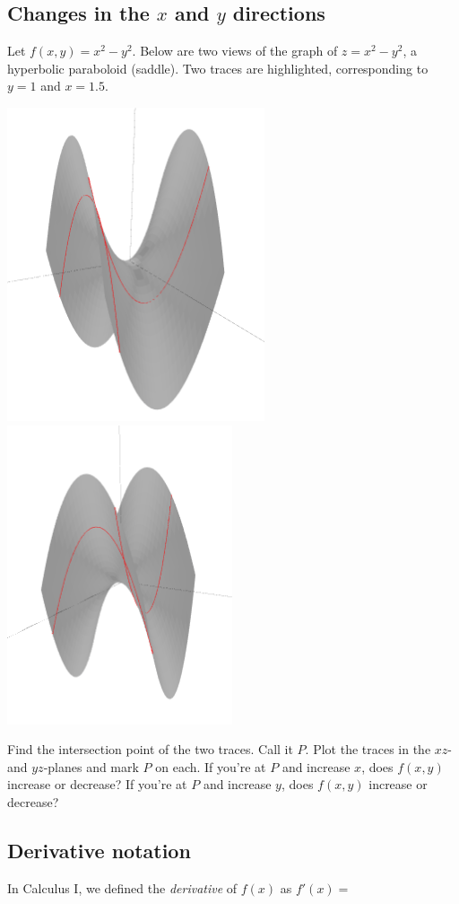 \subsection{Changes in the \texorpdfstring{$x$}{x} and \texorpdfstring{$y$}{y} directions}
\begin{ex}\label{ex:saddle-traces}
    Let $f(x,y)=x^2-y^2$. Below are two views of the graph of $z=x^2-y^2$, a hyperbolic paraboloid (saddle). Two traces are highlighted, corresponding to $y=1$ and $x=1.5$.
    \begin{center}
        \includegraphics[width=.4\textwidth]{images/saddle1.png}
        \hfill 
        \includegraphics[width=.4\textwidth]{images/saddle2.png}\label{img:sage-saddle}
    \end{center}
    Find the intersection point of the two traces. Call it $P$. Plot the traces in the $xz$- and $yz$-planes and mark $P$ on each. If you're at $P$ and increase $x$, does $f(x,y)$ increase or decrease? If you're at $P$ and increase $y$, does $f(x,y)$ increase or decrease?
\end{ex}

\pagebreak 

\subsection{Derivative notation}
In Calculus I, we defined the \emph{derivative} of $f(x)$ as $f'(x)=$ 
\bigskip 

